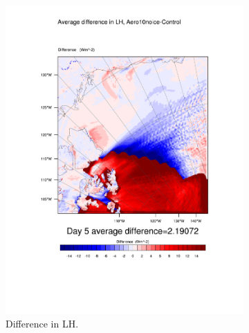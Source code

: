 \begin{figure}
\centering
	\begin{subfigure}{0.48\textwidth}
		\includegraphics[width=\textwidth]{results/aero10ni/diff_Aero10NoIce_LH_Day5.pdf}
		\caption{Difference in LH.}
		\label{subfig:lh_r4Day5}
	\end{subfigure}
	\quad
	\begin{subfigure}{0.48\textwidth}

\end{subfigure}
\end{figure}
